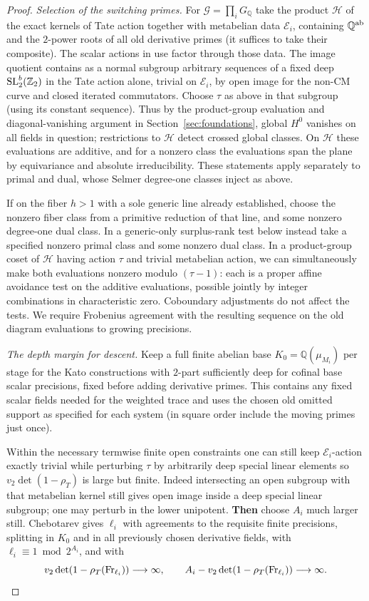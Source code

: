 \begin{proof}
\emph{Selection of the switching primes.} For \(\mathcal G=\prod_i G_\mathbb Q\) take the product \(\mathcal H\) of the exact kernels of Tate action together with metabelian data \(\mathcal E_i\), containing \(\mathbb Q^{\rm ab}\) and the \(2\)-power roots of all old derivative primes (it suffices to take their composite). The scalar actions in use factor through those data. The image quotient contains as a normal subgroup arbitrary sequences of a fixed deep \({\rm SL}_2^b(\mathbb Z_2)\) in the Tate action alone, trivial on \(\mathcal E_i\), by open image for the non-CM curve and closed iterated commutators. Choose \(\tau\) as above in that subgroup (using its constant sequence). Thus by the product-group evaluation and diagonal-vanishing argument in Section~\ref{sec:foundations}, global \(H^0\) vanishes on all fields in question; restrictions to \(\mathcal H\) detect crossed global classes. On \(\mathcal H\) these evaluations are additive, and for a nonzero class the evaluations span the plane by equivariance and absolute irreducibility. These statements apply separately to primal and dual, whose Selmer degree-one classes inject as above.

If on the fiber \(h>1\) with a sole generic line already established, choose the nonzero fiber class from a primitive reduction of that line, and some nonzero degree-one dual class. In a generic-only surplus-rank test below instead take a specified nonzero primal class and some nonzero dual class. In a product-group coset of \(\mathcal H\) having action \(\tau\) and trivial metabelian action, we can simultaneously make both evaluations nonzero modulo \((\tau-1)\): each is a proper affine avoidance test on the additive evaluations, possible jointly by integer combinations in characteristic zero. Coboundary adjustments do not affect the tests. We require Frobenius agreement with the resulting sequence on the old diagram evaluations to growing precisions.

\emph{The depth margin for descent.}
Keep a full finite abelian base \(K_0=\mathbb Q(\mu_{M_i})\) per stage for the Kato constructions with \(2\)-part sufficiently deep for cofinal base scalar precisions, fixed before adding derivative primes. This contains any fixed scalar fields needed for the weighted trace and uses the chosen old omitted support as specified for each system (in square order include the moving primes just once). 

Within the necessary termwise finite open constraints one can still keep \(\mathcal E_i\)-action exactly trivial while perturbing \(\tau\) by arbitrarily deep special linear elements so \(v_2\det(1-\rho_T)\) is large but finite. Indeed intersecting an open subgroup with that metabelian kernel still gives open image inside a deep special linear subgroup; one may perturb in the lower unipotent. \textbf{Then} choose \(A_i\) much larger still. Chebotarev gives \(\ell_i\) with agreements to the requisite finite precisions, splitting in \(K_0\) and in all previously chosen derivative fields, with \(\ell_i\equiv1\bmod 2^{A_i}\), and with
\[
        v_2\det(1-\rho_T({\rm Fr}_{\ell_i}))\longrightarrow\infty,\qquad
        A_i-v_2\det(1-\rho_T({\rm Fr}_{\ell_i}))\longrightarrow\infty .
\]



\end{proof}
